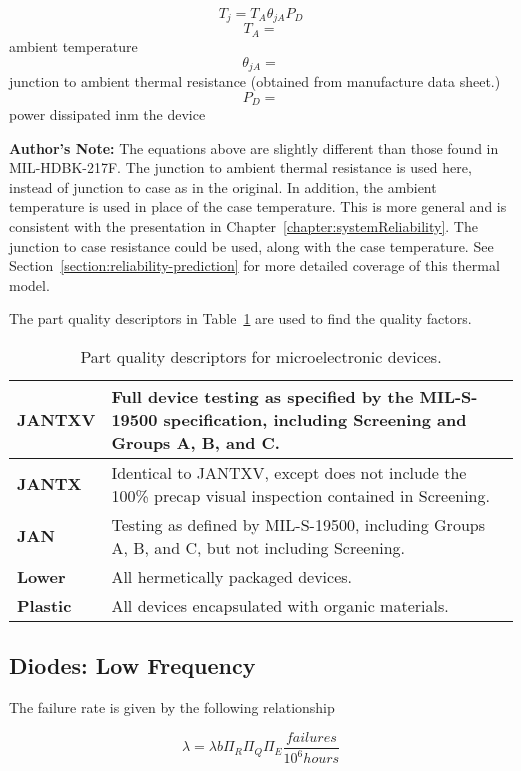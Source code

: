 $$T_{j} = T_{A} \theta_{jA} P_{D}$$
$$T_A = $$ ambient temperature
$$\theta_{jA} = $$junction to ambient thermal resistance (obtained from manufacture data sheet.)
$$P_{D} = $$power dissipated inm the device

\textbf{Author's Note:} The equations above are slightly different than
those found in MIL-HDBK-217F. The junction to ambient thermal resistance
is used here, instead of junction to case as in the original. In
addition, the ambient temperature is used in place of the case
temperature. This is more general and is consistent with the
presentation in Chapter~\ref{chapter:systemReliability}. The junction to case 
resistance could be used, along with the case temperature. See 
Section~\ref{section:reliability-prediction} for more detailed
coverage of this thermal model.

The part quality descriptors in Table~\ref{table:partsQualityDescriptors} are used to find the quality
factors.

\begin{table}
\caption{Part quality descriptors for microelectronic devices.}
\label{table:partsQualityDescriptors}
\begin{tabular}{|l|m{10cm}|} \hline
\textbf{JANTXV} & 
Full device testing as specified by the MIL-S-19500 specification,
including Screening and Groups A, B, and C. \\ \hline
\textbf{JANTX} & Identical to JANTXV, except does not include the 100\%
precap visual inspection contained in Screening. \\ \hline
\textbf{JAN} & Testing as defined by MIL-S-19500, including Groups A, B,
and C, but not including Screening. \\ \hline
\textbf{Lower} & All hermetically packaged devices. \\ \hline
\textbf{Plastic} & All devices encapsulated with organic materials. \\ \hline
\end{tabular}
\end{table}


\subsection{Diodes: Low Frequency}
\label{subsection:diodes-low-frequency}

The failure rate is given by the following relationship

$$\lambda = \lambda{b} \Pi_{R} \Pi_{Q} \Pi_{E} \frac{failures}{10^{6} hours}$$

